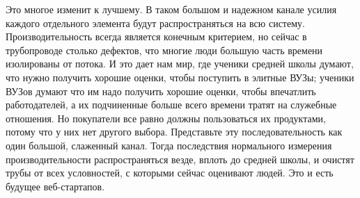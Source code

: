 \documentclass[ebook,12pt,oneside,openany]{memoir}
\begin{document}
Это многое изменит к лучшему. В таком большом и надежном канале усилия
каждого отдельного элемента будут распространяться на всю систему.
Производительность всегда является конечным критерием, но сейчас в
трубопроводе столько дефектов, что многие люди большую часть времени
изолированы от потока. И это дает нам мир, где ученики средней школы
думают, что нужно получить хорошие оценки, чтобы поступить в элитные
ВУЗы; ученики ВУЗов думают что им надо получить хорошие оценки, чтобы
впечатлить работодателей, а их подчиненные больше всего времени тратят
на служебные отношения. Но покупатели все равно должны пользоваться их
продуктами, потому что у них нет другого выбора. Представьте эту
последовательность как один большой, слаженный канал. Тогда
последствия нормального измерения производительности распространяться
везде, вплоть до средней школы, и очистят трубы от всех условностей, с
которыми сейчас оценивают людей. Это и есть будущее веб-стартапов.
\end{document}
